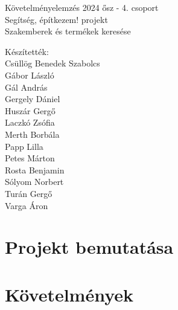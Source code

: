 \documentclass{report}
\begin{document}
\begin{titlepage}
   \centering
   \vspace{.7\baselineskip}
   { \huge
        Követelményelemzés 2024 ősz - 4. csoport \\[1em]
        Segítség, építkezem! projekt \\[2em]
        Szakemberek és termékek keresése \\ [5em]
   }

   Készítették: \\
    Csüllög Benedek Szabolcs \\
    Gábor László \\
    Gál András \\
    Gergely Dániel \\
    Huszár Gergő \\
    Laczkó Zsófia \\
    Merth Borbála \\
    Papp Lilla \\
    Petes Márton \\
    Rosta Benjamin \\
    Sólyom Norbert \\
    Turán Gergő \\
    Varga Áron \\

\end{titlepage}

\tableofcontents

\chapter{Projekt bemutatása}


\chapter{Követelmények}












\end{document}
